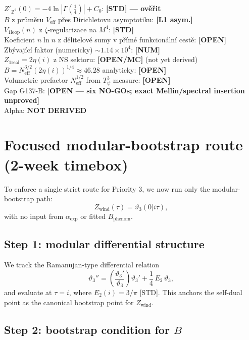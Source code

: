 \documentclass[12pt,a4paper]{article}
\begin{document}
\begin{statusbox}
$Z'_{\mathbb{Z}^2}(0) = -4\ln|\Gamma(\tfrac14)| + C_0$: \textbf{[STD] — ověřit}\\
$B$ z průměru $V_{\mathrm{eff}}$ přes Dirichletovu asymptotiku: \textbf{[L1 asym.]}\\
$V_{1\mathrm{loop}}(n)$ z $\zeta$-regularizace na $M^4$: \textbf{[STD]}\\
Koeficient $n\ln n$ z dělitelové sumy v přímé funkcionální cestě: \textbf{[OPEN]}\\
Zbývající faktor (numericky) $\sim 1.14\times 10^4$: \textbf{[NUM]}\\
$Z_{1\mathrm{real}} = 2\eta(i)$ z NS sektoru: \textbf{[OPEN/MC]} (not yet derived)\\
$B = N_{\mathrm{eff}}^{3/2}(2\eta(i))^{1/4} \approx 46.28$ analyticky: \textbf{[OPEN]}\\
Volumetric prefactor $N_{\mathrm{eff}}^{1/2}$ from $T^3_\psi$ measure: \textbf{[OPEN]}\\
Gap G137-B: \textbf{[OPEN — six NO-GOs; exact Mellin/spectral insertion unproved]}\\
Alpha: \textbf{NOT DERIVED}
\end{statusbox}

\section{Focused modular-bootstrap route (2-week timebox)}
\label{sec:modular_bootstrap}

To enforce a single strict route for Priority 3, we now run only the modular-bootstrap path:
\[
Z_{\mathrm{wind}}(\tau)=\vartheta_3(0|i\tau),
\]
with no input from $\alpha_{\mathrm{exp}}$ or fitted $B_{\mathrm{phenom}}$.

\subsection*{Step 1: modular differential structure}

We track the Ramanujan-type differential relation
\[
\vartheta_3'' = \left(\frac{\vartheta_3'}{\vartheta_3}\right)\vartheta_3'
+ \frac14\,E_2\,\vartheta_3,
\]
and evaluate at $\tau=i$, where $E_2(i)=3/\pi$ [STD].  This anchors the
self-dual point as the canonical bootstrap point for $Z_{\mathrm{wind}}$.

\subsection*{Step 2: bootstrap condition for $B$}
\end{document}
